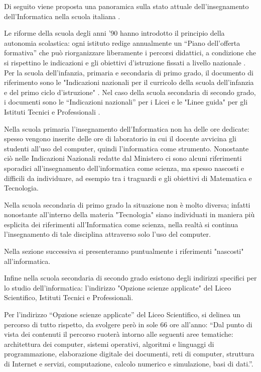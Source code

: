 \documentclass[12pt]{report}
\begin{document}
Di seguito viene proposta una panoramica sulla stato attuale dell'insegnamento dell'Informatica nella scuola italiana \cite{BellettiniTFA2015}.

\noindent Le riforme della scuola degli anni '90 hanno introdotto il principio della autonomia scolastica: ogni istituto redige annualmente un “Piano dell'offerta formativa” che può riorganizzare liberamente i percorsi didattici, a condizione che si rispettino le indicazioni e gli obiettivi d'istruzione fissati a livello nazionale \cite{BellettiniTFA2015}.
Per la scuola dell'infanzia, primaria e secondaria di primo grado, il documento di riferimento sono le "Indicazioni nazionali per il curricolo della scuola dell'infanzia e del primo ciclo d'istruzione" \cite{indicazioniNazionali}.
Nel caso della scuola secondaria di secondo grado, i documenti sono le “Indicazioni nazionali” per i Licei \cite{IndicazioniLicei} e le "Linee guida" per gli Istituti Tecnici e Professionali \cite{IndicazioniIstituti}.

Nella scuola primaria l'insegnamento dell'Informatica non ha delle ore dedicate: spesso vengono inserite delle ore di laboratorio in cui il docente avvicina gli studenti all'uso del computer, quindi l'informatica come strumento. Nonostante ciò nelle Indicazioni Nazionali redatte dal Ministero ci sono alcuni riferimenti sporadici all'insegnamento dell'informatica come scienza, ma spesso nascosti e difficili da individuare, ad esempio tra i traguardi e gli obiettivi di Matematica e Tecnologia.

Nella scuola secondaria di primo grado la situazione non è molto diversa; infatti nonostante all'interno della materia "Tecnologia" siano individuati in maniera più esplicita dei riferimenti all'Informatica come scienza, nella realtà si continua l'insegnamento di tale disciplina attraverso solo l'uso del computer.

Nella sezione successiva si presenteranno puntualmente i riferimenti "nascosti" all'informatica.

Infine nella scuola secondaria di secondo grado esistono degli indirizzi specifici per lo studio dell'informatica: l'indirizzo "Opzione scienze applicate" del Liceo Scientifico, Istituti Tecnici e Professionali. 

Per l'indirizzo “Opzione scienze applicate” del Liceo Scientifico,  si delinea un percorso di tutto rispetto, da svolgere però in sole 66 ore all'anno: “Dal punto di vista dei contenuti il percorso ruoterà intorno alle seguenti aree tematiche: architettura dei computer, sistemi operativi, algoritmi e linguaggi di programmazione, elaborazione digitale dei documenti, reti di computer, struttura di Internet e servizi, computazione, calcolo numerico e simulazione, basi di dati.”\cite{IndicazioniLicei}.
\end{document}
